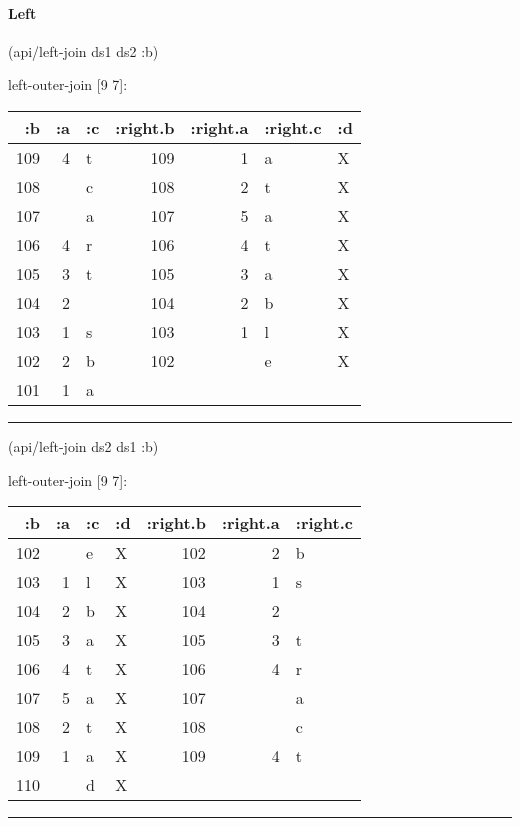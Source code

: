 \documentclass[]{article}
\newenvironment{Shaded}{\begin{snugshade}}{\end{snugshade}}
\newcommand{\AttributeTok}[1]{\textcolor[rgb]{0.77,0.63,0.00}{#1}}
\newcommand{\NormalTok}[1]{#1}
\let\oldparagraph\paragraph
\renewcommand{\paragraph}[1]{\oldparagraph{#1}\mbox{}}
\begin{document}
\paragraph{Left}\label{left}

\begin{Shaded}
\begin{Highlighting}[]
\NormalTok{(api/left-join ds1 ds2 }\AttributeTok{:b}\NormalTok{)}
\end{Highlighting}
\end{Shaded}

left-outer-join {[}9 7{]}:

\begin{longtable}[]{@{}rrlrrll@{}}
\toprule
:b & :a & :c & :right.b & :right.a & :right.c & :d\tabularnewline
\midrule
\endhead
109 & 4 & t & 109 & 1 & a & X\tabularnewline
108 & & c & 108 & 2 & t & X\tabularnewline
107 & & a & 107 & 5 & a & X\tabularnewline
106 & 4 & r & 106 & 4 & t & X\tabularnewline
105 & 3 & t & 105 & 3 & a & X\tabularnewline
104 & 2 & & 104 & 2 & b & X\tabularnewline
103 & 1 & s & 103 & 1 & l & X\tabularnewline
102 & 2 & b & 102 & & e & X\tabularnewline
101 & 1 & a & & & &\tabularnewline
\bottomrule
\end{longtable}

\begin{center}\rule{0.5\linewidth}{0.5pt}\end{center}

\begin{Shaded}
\begin{Highlighting}[]
\NormalTok{(api/left-join ds2 ds1 }\AttributeTok{:b}\NormalTok{)}
\end{Highlighting}
\end{Shaded}

left-outer-join {[}9 7{]}:

\begin{longtable}[]{@{}rrllrrl@{}}
\toprule
:b & :a & :c & :d & :right.b & :right.a & :right.c\tabularnewline
\midrule
\endhead
102 & & e & X & 102 & 2 & b\tabularnewline
103 & 1 & l & X & 103 & 1 & s\tabularnewline
104 & 2 & b & X & 104 & 2 &\tabularnewline
105 & 3 & a & X & 105 & 3 & t\tabularnewline
106 & 4 & t & X & 106 & 4 & r\tabularnewline
107 & 5 & a & X & 107 & & a\tabularnewline
108 & 2 & t & X & 108 & & c\tabularnewline
109 & 1 & a & X & 109 & 4 & t\tabularnewline
110 & & d & X & & &\tabularnewline
\bottomrule
\end{longtable}

\begin{center}\rule{0.5\linewidth}{0.5pt}\end{center}
\end{document}
